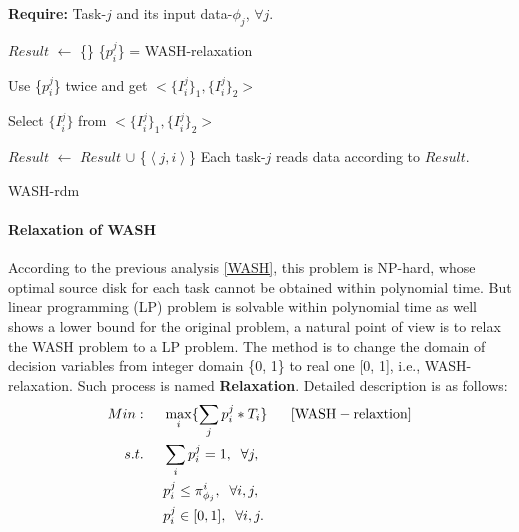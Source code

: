 \documentclass[conference]{IEEEtran}
\begin{document}
 \begin{algorithm}
 	\textbf{Require:} Task-$j$ and its input data-$\phi_j$, $\forall j$. %
 	\begin{algorithmic}[1]	
 		\State $Result$ $\gets$ \{\}
 		\State \{$p_i^j$\} = WASH-relaxation		
 		
 		
 		\State Use \{$p_i^j$\} twice and get $<\{I_i^j\}_1, \{I_i^j\}_2 >$
 		
		\State Select $\{I_i^j\}$ from $<\{I_i^j\}_1, \{I_i^j\}_2>$


 			\State $Result$ $\gets$ $Result$ $\cup$ 	
 			\{$\left \langle j, i\right \rangle$\}
 			\EndIf
 		\EndFor	
 		\State Each task-$j$ reads data according to $Result$.
 	\end{algorithmic}
 	\caption{WASH-rdm}\label{WASH-rdm}
 \end{algorithm}

\paragraph{\textbf{Relaxation of WASH}} According to the previous analysis \ref{WASH}, this problem is NP-hard, whose optimal source disk for each task cannot be obtained within polynomial time. But linear programming (LP) problem is solvable within polynomial time as well shows a lower bound for the original problem, a natural point of view is to relax the WASH problem to a LP problem. The method is to change the domain of decision variables from integer domain \{0, 1\} to real one [0, 1], i.e., WASH-relaxation. Such process is named \textbf{Relaxation}. Detailed description is as follows: 
\vspace{-0.2cm}
 \begin{align}
 Min:&\;\;\;\;\;\max\limits_{i}\{\sum_{j}p_i^j*T_i\}\;\;\;\;\;\;[\rm{WASH-relaxtion}]\nonumber\\
 s.t. 
 &\;\;\;\;\;\sum_{i}p_i^j = 1,\;\;\forall j,\nonumber\\
 &\;\;\;\;\;p_i^j \leq \pi_{\phi_j}^{i},\;\;\forall i,j,\nonumber\\
 &\;\;\;\;\;p_i^j \in[0, 1],\;\;\forall i,j.\nonumber
 \end{align}
\end{document}
